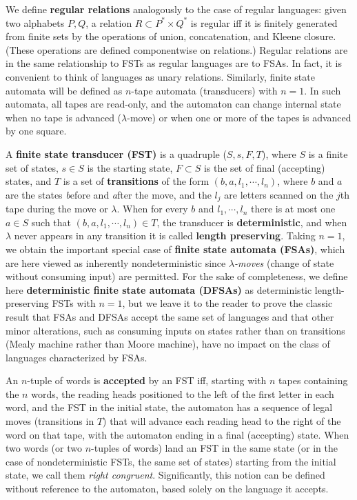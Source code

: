 We define {\bf regular relations} analogously to the case of regular
languages: given two alphabets $P,Q$, a relation $R \subset P^* \times Q^*$ is
regular iff it is finitely generated from finite sets by the operations of
union, concatenation, and Kleene closure. (These operations are defined
componentwise on relations.) Regular relations are in
the same relationship to FSTs as regular languages are to FSAs. In fact, it is
convenient to think of languages as unary relations. Similarly, finite state
automata will be defined as $n$-tape automata (transducers) with $n=1$. In
such automata, all tapes are read-only, and the automaton can change internal
state when no tape is advanced ($\lambda$-move) or when one or more of the
tapes is advanced by one square.

\smallskip{} A {\bf finite state transducer
(FST)}  is a quadruple ($S, s, F,
T$), where $S$ is a finite set of states, $s \in S$ is the starting state, $F
\subset S$ is the set of final (accepting) states, and $T$ is a set of {\bf
transitions} of the form $(b,a,l_1,\cdots,l_n)$, where $b$
and $a$ are the states {\it b}efore and {\it a}fter the move, and the $l_j$
are letters scanned on the $j$th tape during the move or $\lambda$.  When for
every $b$ and $l_1,\cdots,l_n$ there is at most one $a \in S$ such that
$(b,a,l_1,\cdots,l_n) \in T$, the transducer is {\bf deterministic}, and when
$\lambda$ never appears in any transition it is called {\bf
length preserving}.
Taking $n=1$, we obtain the important special case of {\bf finite
state automata (FSAs)}, which are here viewed as
inherently nondeterministic since {\it $\lambda$-moves} (change
of state without consuming input) are permitted. For the
sake of completeness, we define here {\bf deterministic finite state automata
(DFSAs)} as
deterministic length-preserving FSTs with $n=1$, but we leave it to the reader
to prove the classic result that FSAs and DFSAs accept the same set of
languages and that other minor alterations, such as consuming inputs on
states rather than on transitions (Mealy machine rather than Moore machine),
have no impact on the class of languages characterized by FSAs.

\medskip\noindent
An $n$-tuple of words is {\bf accepted} by an FST iff, starting with $n$ tapes
containing the $n$ words, the reading heads positioned to the left of the
first letter in each word, and the FST in the initial state, the automaton has
a sequence of legal moves (transitions in $T$) that will advance each reading
head to the right of the word on that tape, with the automaton ending in a
final (accepting) state.  When two words (or two $n$-tuples of words) land an
FST in the same state (or in the case of nondeterministic FSTs, the same set
of states) starting from the initial state, we call them {\it right congruent}.
  Significantly, this notion can be defined
without reference to the automaton, based solely on the language it accepts.

